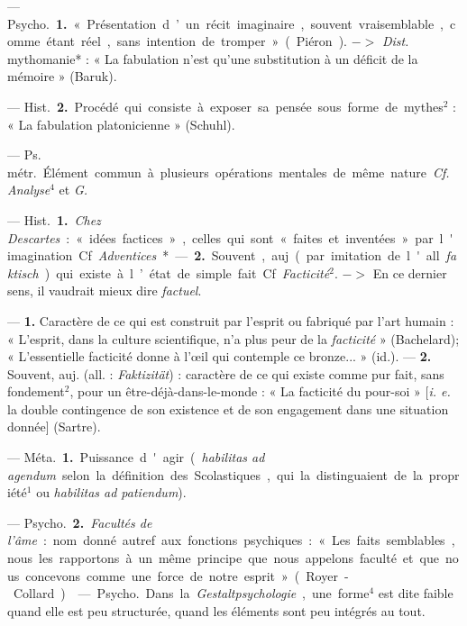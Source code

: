 
	\begin{itemize}[leftmargin=1cm, label=, itemsep=1pt]

 — \si{Psycho.} {\bf 1.} « Présentation d’un récit imaginaire, souvent vraisemblable, comme étant
réel, sans intention de tromper »
(Piéron). $->$ {\it Dist.} mythomanie* :
« La fabulation n’est qu’une substitution à un déficit de la mémoire »
(Baruk).

— \si{Hist.} {\bf 2.} Procédé qui consiste
à exposer sa pensée sous forme de
mythes$^2$ : « La fabulation platonicienne » (Schuhl).

 — \si{Ps. métr.} Élément commun
à plusieurs opérations mentales de
même nature. {\it Cf.} {\it Analyse}$^4$ et {\it G.}

 — \si{Hist.} {\bf 1.} {\it Chez Descartes} :
« idées factices », celles qui sont
« faites et inventées » par l'imagination. Cf. {\it Adventices}* — {\bf 2.} Souvent, auj. (par imitation de l'all.
{\it faktisch}) qui existe à l’état de
simple fait. Cf. {\it Facticité}$^2$. $->$ En
ce dernier sens, il vaudrait mieux dire {\it factuel}.

 — {\bf 1.} Caractère de ce qui est construit par l'esprit ou 
fabriqué par l'art humain : « L'esprit, dans la culture scientifique, n’a
plus peur de la {\it facticité} » (Bachelard); « L’essentielle facticité
donne à l’œil qui contemple ce bronze... » (id.). —
 {\bf 2.} Souvent, auj. (all. : {\it Faktizität}) :
caractère de ce qui existe comme pur fait, sans fondement$^2$, pour un
être-déjà-dans-le-monde : « La facticité du pour-soi » [{\it i. e.} la double
contingence de son existence et de son engagement dans une situation
donnée] (Sartre).

 — \si{Méta.} {\bf 1.} Puissance d'agir
({\it habilitas ad agendum} selon la définition des Scolastiques, qui la distinguaient de la propriété$^1$ ou {\it habilitas ad patiendum}).

— \si{Psycho.} {\bf 2.} {\it Facultés de l'âme} : nom donné autref. aux
fonctions psychiques : « Les faits semblables, nous les rapportons à un même
principe que nous appelons faculté et que nous concevons comme une force
de notre esprit » (Royer-Collard).

 — \si{Psycho.} Dans la {\it Gestaltpsychologie}, une forme$^4$
est dite faible quand elle est peu structurée,
quand les éléments sont peu intégrés au tout.


\end{itemize}
